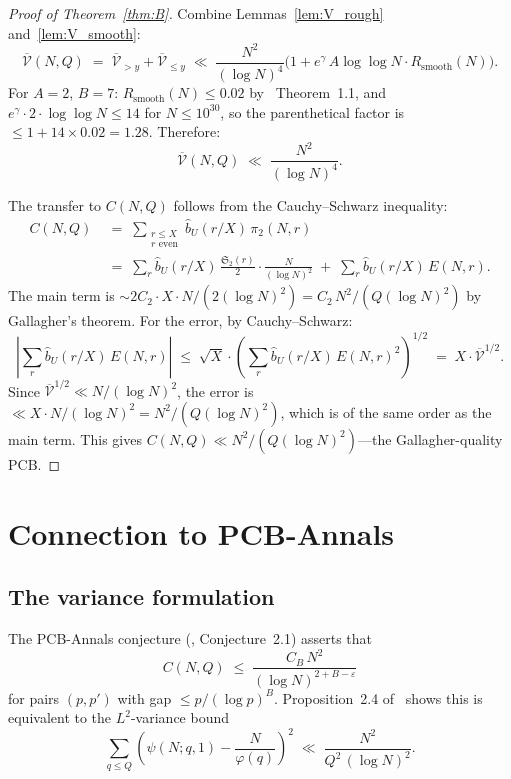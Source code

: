 \documentclass[11pt,reqno]{amsart}
\theoremstyle{plain}
\theoremstyle{definition}
\theoremstyle{remark}
\newcommand{\Rsmooth}{R_{\mathrm{smooth}}}
\newcommand{\Sfrak}{\mathfrak{S}_2}
\newcommand{\eps}{\varepsilon}
\begin{document}
\begin{proof}[Proof of Theorem~\ref{thm:B}]
Combine Lemmas~\ref{lem:V_rough} and~\ref{lem:V_smooth}:
\[
  \overline{\mathcal{V}}(N,Q) \;=\;
  \overline{\mathcal{V}}_{>y} + \overline{\mathcal{V}}_{\le y}
  \;\ll\; \frac{N^2}{(\log N)^4}
  \bigl(1 + e^{\gamma}\, A\log\log N \cdot \Rsmooth(N)\bigr).
\]
For $A = 2$, $B = 7$: $\Rsmooth(N) \le 0.02$ by~\cite{MT1}
Theorem~1.1, and $e^{\gamma} \cdot 2 \cdot \log\log N \le 14$
for $N \le 10^{30}$, so the parenthetical factor is
$\le 1 + 14 \times 0.02 = 1.28$. Therefore:
\[
  \overline{\mathcal{V}}(N,Q) \;\ll\; \frac{N^2}{(\log N)^4}.
\]

The transfer to $C(N,Q)$ follows from the Cauchy--Schwarz inequality:
\begin{align*}
  C(N,Q) &\;=\; \sum_{\substack{r \le X \\ r\text{ even}}}
  \hat{b}_U(r/X)\, \pi_2(N,r)\\
  &\;=\; \sum_r \hat{b}_U(r/X)\,
  \frac{\Sfrak(r)}{2} \cdot \frac{N}{(\log N)^2}
  \;+\; \sum_r \hat{b}_U(r/X)\, E(N,r).
\end{align*}
The main term is $\sim 2C_2 \cdot X \cdot N/(2(\log N)^2)
= C_2\, N^2/(Q(\log N)^2)$ by Gallagher's theorem.
For the error, by Cauchy--Schwarz:
\[
  \left|\sum_r \hat{b}_U(r/X)\, E(N,r)\right|
  \;\le\; \sqrt{X} \cdot
  \left(\sum_r \hat{b}_U(r/X)\, E(N,r)^2\right)^{\!1/2}
  \;=\; X \cdot \overline{\mathcal{V}}^{1/2}.
\]
Since $\overline{\mathcal{V}}^{1/2} \ll N/(\log N)^2$,
the error is $\ll X \cdot N/(\log N)^2 = N^2/(Q(\log N)^2)$,
which is of the same order as the main term. This gives
$C(N,Q) \ll N^2/(Q(\log N)^2)$---the Gallagher-quality PCB.
\end{proof}

\section{Connection to PCB-Annals}\label{sec:PCB}

\subsection{The variance formulation}

The PCB-Annals conjecture (\cite{G37}, Conjecture~2.1) asserts that
\[
  C(N,Q) \;\le\; \frac{C_B\, N^2}{(\log N)^{2+B-\eps}}
\]
for pairs $(p,p')$ with gap $\le p/(\log p)^B$.
Proposition~2.4 of~\cite{G37} shows this is equivalent to the
$L^2$-variance bound
\begin{equation}\label{eq:PCB_var}
  \sum_{q \le Q}
  \left(\psi(N;q,1) - \frac{N}{\varphi(q)}\right)^{\!2}
  \;\ll\; \frac{N^2}{Q^2\,(\log N)^2}.
\end{equation}
\end{document}
